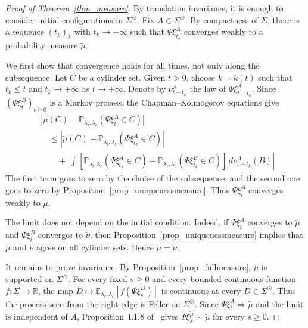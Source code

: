 \documentclass[11pt,a4paper]{article}
\theoremstyle{plain}
\theoremstyle{definition}
\theoremstyle{remark}
\numberwithin{equation}{section}
\begin{document}
	\begin{proof}[Proof of Theorem~\ref{thm_measure}]
		By translation invariance, it is enough to consider initial configurations in $\Sigma^{\odot}$. Fix $A\in\Sigma^{\odot}$. By compactness of $\Sigma$, there is a sequence $(t_k)_k$ with $t_k\to+\infty$ such that $\Psi\xi_{t_k}^A$ converges weakly to a probability measure $\tilde{\mu}$.
		
		We first show that convergence holds for all times, not only along the subsequence. Let $C$ be a cylinder set. Given $t>0$, choose $k=k(t)$ such that $t_k\leq t$ and $t_k\to+\infty$ as $t\to+\infty$. Denote by $\nu^A_{t-t_k}$ the law of $\Psi\xi^A_{t-t_k}$. Since $(\Psi\xi_t^B)_{t\geq0}$ is a Markov process, the Chapman--Kolmogorov equations give
		\begin{align*}
			&\left|\tilde{\mu}(C)-\mathbb{P}_{\lambda_i,\lambda_e}(\Psi\xi_t^A\in C)\right|\\
			&\quad\leq
			\left|\tilde{\mu}(C)-\mathbb{P}_{\lambda_i,\lambda_e}(\Psi\xi_{t_k}^A\in C)\right|\\
			&\qquad+
			\left|\int
			\left[
			\mathbb{P}_{\lambda_i,\lambda_e}(\Psi\xi_{t_k}^A\in C)
			-
			\mathbb{P}_{\lambda_i,\lambda_e}(\Psi\xi_{t_k}^B\in C)
			\right]
			\,d\nu^A_{t-t_k}(B)\right|.
		\end{align*}
		The first term goes to zero by the choice of the subsequence, and the second one goes to zero by Proposition~\ref{prop_uniquenessmeasure}. Thus $\Psi\xi_t^A$ converges weakly to $\tilde{\mu}$.
		
		The limit does not depend on the initial condition. Indeed, if $\Psi\xi_t^A$ converges to $\tilde{\mu}$ and $\Psi\xi_t^B$ converges to $\tilde{\nu}$, then Proposition~\ref{prop_uniquenessmeasure} implies that $\tilde{\mu}$ and $\tilde{\nu}$ agree on all cylinder sets. Hence $\tilde{\mu}=\tilde{\nu}$.
		
		It remains to prove invariance. By Proposition~\ref{prop_fullmeasure}, $\tilde{\mu}$ is supported on $\Sigma^{\odot}$. For every fixed $s\geq0$ and every bounded continuous function $f:\Sigma\to\mathbb{R}$, the map $D\mapsto\mathbb{E}_{\lambda_i,\lambda_e}[f(\Psi\xi_s^D)]$ is continuous at every $D\in\Sigma^{\odot}$. Thus the process seen from the right edge is Feller on $\Sigma^{\odot}$. Since $\Psi\xi_t^A\Rightarrow\tilde{\mu}$ and the limit is independent of $A$, Proposition~I.1.8 of~\cite{Liggett05} gives $\Psi\xi_s^{\tilde{\mu}}\sim\tilde{\mu}$ for every $s\geq0$.
	\end{proof}
	
\end{document}
